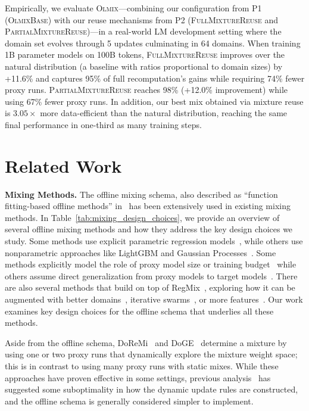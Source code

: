 \documentclass[table]{ai2style/ai2}
\newcommand{\olmix}{\textsc{Olmix}\xspace}
\newcommand{\base}[0]{\textsc{OlmixBase}\xspace}
\newcommand{\fullmixreuse}[0]{\textsc{FullMixtureReuse}\xspace}
\newcommand{\partialmixreuse}[0]{\textsc{PartialMixtureReuse}\xspace}
\begin{document}
Empirically, we evaluate \olmix---combining our configuration from P1 (\base) with our reuse mechanisms from P2 (\fullmixreuse and \partialmixreuse)---in a real-world LM development setting where the domain set evolves through 5 updates culminating in 64 domains.
When training 1B parameter models on 100B tokens, \fullmixreuse improves over the natural distribution (a baseline with ratios proportional to domain sizes) by +11.6\% and captures 95\% of full recomputation's gains while requiring 74\% fewer proxy runs.
\partialmixreuse reaches 98\% (+12.0\% improvement) while using 67\% fewer proxy runs.
In addition, our best mix obtained via mixture reuse is $3.05\times$ more data-efficient than the natural distribution, reaching the same final performance in one-third as many training steps.

\section{Related Work}

\textbf{Mixing Methods.} The offline mixing schema, also described as ``function fitting-based offline methods'' in~\citet{liu2025rethinkingdatamixturelarge} has been extensively used in existing mixing methods. In Table~\ref{tab:mixing_design_choices}, we provide an overview of several offline mixing methods and how they address the key design choices we study. Some methods use explicit parametric regression models~\citep{que2024dcptlawdomainspecificcontinual}, while others use nonparametric approaches like LightGBM and Gaussian Processes~\citep{liu2025regmixdatamixtureregression, chen2025admirebayesoptaccelerateddatamixture}. Some methods explicitly model the role of proxy model size or training budget~\citep{ge2025bimixbivariatedatamixing, ye2025datamixinglawsoptimizing, kang2025autoscalescaleawaredatamixing} while others assume direct generalization from proxy models to target models~\citep{held2025optimizingpretrainingdatamixtures}. There are also several methods that build on top of RegMix~\citep{liu2025regmixdatamixtureregression}, exploring how it can be augmented with better domains~\citep{wettig2025organizewebconstructingdomains}, iterative swarms~\citep{diao2025climbclusteringbasediterativedata}, or more features~\citep{belenki2025optimizingpretrainingdatamixtures}. Our work examines key design choices for the offline schema that underlies all these methods. 

Aside from the offline schema, DoReMi~\citep{xie2023doremioptimizingdatamixtures} and DoGE~\citep{fan2024dogedomainreweightinggeneralization} determine a mixture by using one or two proxy runs that dynamically explore the mixture weight space; this is in contrast to using many proxy runs with static mixes. While these approaches have proven effective in some settings, previous analysis~\citep{chen2025aioliunifiedoptimizationframework} has suggested some suboptimality in how the dynamic update rules are constructed, and the offline schema is generally considered simpler to implement.
\end{document}
